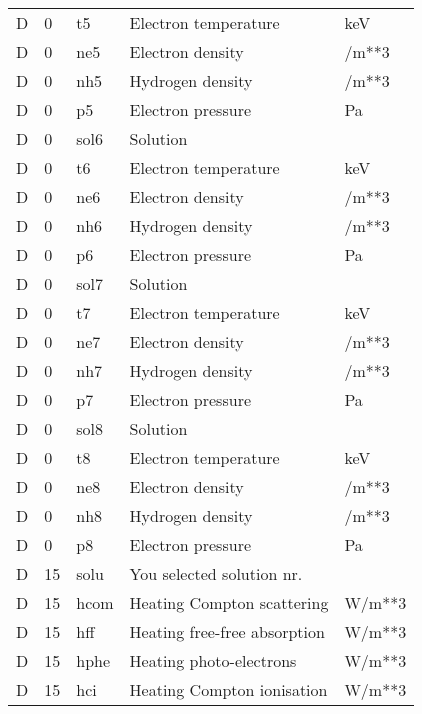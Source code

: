 \begin{table}[!p]
\begin{tabular}{lllll}
D &  0 & t5   & Electron temperature             & keV              \\
D &  0 & ne5  & Electron density                 & /m**3            \\
D &  0 & nh5  & Hydrogen density                 & /m**3            \\
D &  0 & p5   & Electron pressure                & Pa               \\
D &  0 & sol6 & Solution                         &                  \\
D &  0 & t6   & Electron temperature             & keV              \\
D &  0 & ne6  & Electron density                 & /m**3            \\
D &  0 & nh6  & Hydrogen density                 & /m**3            \\
D &  0 & p6   & Electron pressure                & Pa               \\
D &  0 & sol7 & Solution                         &                  \\
D &  0 & t7   & Electron temperature             & keV              \\
D &  0 & ne7  & Electron density                 & /m**3            \\
D &  0 & nh7  & Hydrogen density                 & /m**3            \\
D &  0 & p7   & Electron pressure                & Pa               \\
D &  0 & sol8 & Solution                         &                  \\
D &  0 & t8   & Electron temperature             & keV              \\
D &  0 & ne8  & Electron density                 & /m**3            \\
D &  0 & nh8  & Hydrogen density                 & /m**3            \\
D &  0 & p8   & Electron pressure                & Pa               \\
D & 15 & solu & You selected solution nr.        &                  \\
D & 15 & hcom & Heating Compton scattering       & W/m**3           \\
D & 15 & hff  & Heating free-free absorption     & W/m**3           \\
D & 15 & hphe & Heating photo-electrons          & W/m**3           \\
D & 15 & hci  & Heating Compton ionisation       & W/m**3           \\

\end{tabular}
\end{table}
